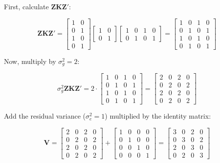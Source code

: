 \documentclass[12pt,a4paper]{article}
\begin{document}
First, calculate $\mathbf{ZKZ'}$:

\[
\mathbf{ZKZ'} = 
\begin{bmatrix}
    1 & 0 \\
    0 & 1 \\
    1 & 0 \\
    0 & 1
\end{bmatrix}
\begin{bmatrix}
    1 & 0 \\
    0 & 1
\end{bmatrix}
\begin{bmatrix}
    1 & 0 & 1 & 0 \\
    0 & 1 & 0 & 1
\end{bmatrix}
=
\begin{bmatrix}
    1 & 0 & 1 & 0 \\
    0 & 1 & 0 & 1 \\
    1 & 0 & 1 & 0 \\
    0 & 1 & 0 & 1
\end{bmatrix}
\]

Now, multiply by $\sigma^2_g = 2$:

\[
\sigma^2_g \mathbf{ZKZ'} = 2 \cdot 
\begin{bmatrix}
    1 & 0 & 1 & 0 \\
    0 & 1 & 0 & 1 \\
    1 & 0 & 1 & 0 \\
    0 & 1 & 0 & 1
\end{bmatrix}
=
\begin{bmatrix}
    2 & 0 & 2 & 0 \\
    0 & 2 & 0 & 2 \\
    2 & 0 & 2 & 0 \\
    0 & 2 & 0 & 2
\end{bmatrix}
\]

Add the residual variance ($\sigma^2_e = 1$) multiplied by the identity matrix:

\[
\mathbf{V} = 
\begin{bmatrix}
    2 & 0 & 2 & 0 \\
    0 & 2 & 0 & 2 \\
    2 & 0 & 2 & 0 \\
    0 & 2 & 0 & 2
\end{bmatrix}
+
\begin{bmatrix}
    1 & 0 & 0 & 0 \\
    0 & 1 & 0 & 0 \\
    0 & 0 & 1 & 0 \\
    0 & 0 & 0 & 1
\end{bmatrix}
=
\begin{bmatrix}
    3 & 0 & 2 & 0 \\
    0 & 3 & 0 & 2 \\
    2 & 0 & 3 & 0 \\
    0 & 2 & 0 & 3
\end{bmatrix}
\]
\end{document}
